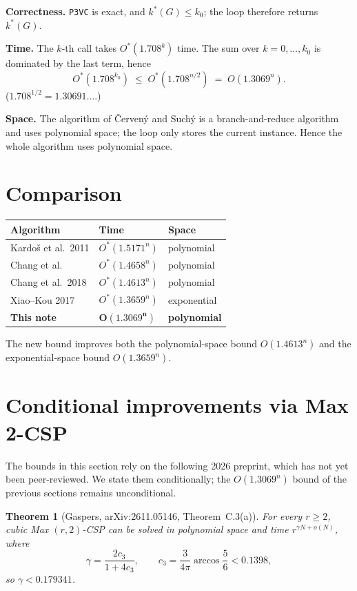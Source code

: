 \documentclass[11pt]{article}
\newtheorem*{theorem*}{Theorem}
\begin{document}
\textbf{Correctness.} \texttt{P3VC} is exact, and $k^*(G) \le k_0$; the loop therefore
returns $k^*(G)$.

\textbf{Time.} The $k$-th call takes $O^*(1.708^k)$ time. The sum over
$k=0,\dots,k_0$ is dominated by the last term, hence
\[
  O^*(1.708^{k_0}) \;\le\; O^*(1.708^{n/2}) \;=\; O(1.3069^n).
\]
($1.708^{1/2} = 1.30691\ldots$.)

\textbf{Space.} The algorithm of \v{C}erven\'y and Such\'y is a branch-and-reduce
algorithm and uses polynomial space; the loop only stores the current instance. Hence
the whole algorithm uses polynomial space.

\section{Comparison}

\begin{center}
\begin{tabular}{lll}
\hline
Algorithm & Time & Space \\
\hline
Kardo\v{s} et al.\ 2011 & $O^*(1.5171^n)$ & polynomial \\
Chang et al. & $O^*(1.4658^n)$ & polynomial \\
Chang et al.\ 2018 & $O^*(1.4613^n)$ & polynomial \\
Xiao--Kou 2017 & $O^*(1.3659^n)$ & exponential \\
\textbf{This note} & $\boldsymbol{O(1.3069^n)}$ & \textbf{polynomial} \\
\hline
\end{tabular}
\end{center}

The new bound improves both the polynomial-space bound $O(1.4613^n)$ and the
exponential-space bound $O(1.3659^n)$.

\section{Conditional improvements via Max 2-CSP}

The bounds in this section rely on the following 2026 preprint, which has not yet
been peer-reviewed. We state them conditionally; the \(O(1.3069^n)\) bound of the
previous sections remains unconditional.

\begin{theorem*}[Gaspers, arXiv:2611.05146, Theorem~C.3(a)]
For every \(r\ge2\), cubic Max \((r,2)\)-CSP can be solved in polynomial space and
time \(r^{\gamma N+o(N)}\), where
\[
  \gamma=\frac{2c_3}{1+4c_3},\qquad
  c_3=\frac{3}{4\pi}\arccos\frac56<0.1398,
\]
so \(\gamma<0.179341\).
\end{theorem*}
\end{document}
